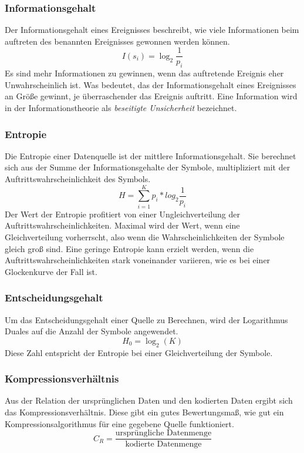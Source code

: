 \subsubsection*{Informationsgehalt}
Der Informationsgehalt eines Ereignisses beschreibt, wie viele Informationen beim auftreten des benannten Ereignisses gewonnen werden können.
\begin{equation*}
I(s_i) = \log_2 \frac{1}{p_i}
\end{equation*}
Es sind mehr Informationen zu gewinnen, wenn das auftretende Ereignis eher Unwahrscheinlich ist.
Was bedeutet, das der Informationsgehalt eines Ereignisses an Größe gewinnt, je überraschender das Ereignis auftritt.
Eine Information wird in der Informationstheorie als \textit{beseitigte Unsicherheit} bezeichnet.

\subsubsection*{Entropie}
Die Entropie einer Datenquelle ist der mittlere Informationsgehalt.
Sie berechnet sich aus der Summe der Informationsgehalte der Symbole, multipliziert mit der Auftrittswahrscheinlichkeit des Symbols.
\begin{equation*}
H = \sum_{i = 1}^{K} p_i * log_2 \frac{1}{p_i}
\end{equation*}
Der Wert der Entropie profitiert von einer Ungleichverteilung der Auftrittswahrscheinlichkeiten.
Maximal wird der Wert, wenn eine Gleichverteilung vorherrscht, also wenn die Wahrscheinlichkeiten der Symbole gleich groß sind.
Eine geringe Entropie kann erzielt werden, wenn die Auftrittswahrscheinlichkeiten stark voneinander variieren, wie es bei einer Glockenkurve der Fall ist. 

\subsubsection*{Entscheidungsgehalt}
Um das Entscheidungsgehalt einer Quelle zu Berechnen, wird der Logarithmus Duales auf die Anzahl der Symbole angewendet.
\begin{equation*}
H_0 = \log_2 (K)
\end{equation*}
Diese Zahl entspricht der Entropie bei einer Gleichverteilung der Symbole.

\subsubsection*{Kompressionsverhältnis}
Aus der Relation der ursprünglichen Daten und den kodierten Daten ergibt sich das Kompressionsverhältnis.
Diese gibt ein gutes Bewertungsmaß, wie gut ein Kompressionsalgorithmus für eine gegebene Quelle funktioniert.
\begin{equation*}
C_R = \frac{\text{ursprüngliche Datenmenge}}{\text{kodierte Datenmenge}}
\end{equation*}

